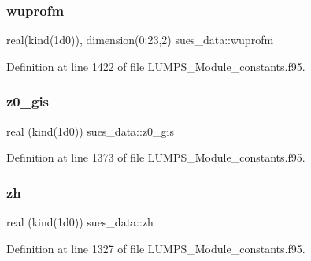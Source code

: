 \subsubsection{\texorpdfstring{wuprofm}{wuprofm}}
{\footnotesize\ttfamily real(kind(1d0)), dimension(0\+:23,2) sues\+\_\+data\+::wuprofm}



Definition at line 1422 of file L\+U\+M\+P\+S\+\_\+\+Module\+\_\+constants.\+f95.

\mbox{\label{namespacesues__data_a7c7f724d95b99e3b5ff7e350e70f1fb1}} 
\subsubsection{\texorpdfstring{z0\+\_\+gis}{z0\_gis}}
{\footnotesize\ttfamily real (kind(1d0)) sues\+\_\+data\+::z0\+\_\+gis}



Definition at line 1373 of file L\+U\+M\+P\+S\+\_\+\+Module\+\_\+constants.\+f95.

\mbox{\label{namespacesues__data_a738f60744a0e91f90a050542ad946898}} 
\subsubsection{\texorpdfstring{zh}{zh}}
{\footnotesize\ttfamily real (kind(1d0)) sues\+\_\+data\+::zh}



Definition at line 1327 of file L\+U\+M\+P\+S\+\_\+\+Module\+\_\+constants.\+f95.

